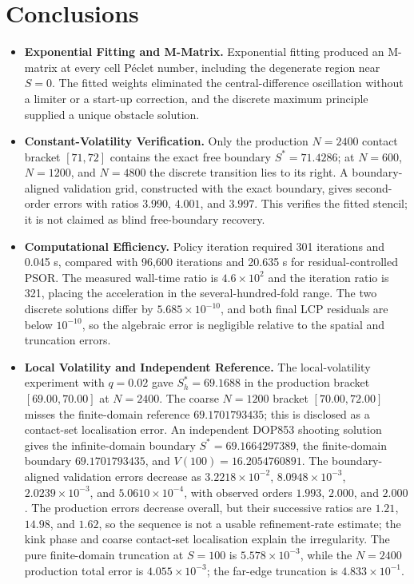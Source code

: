 \documentclass[11pt,a4paper]{article}
\theoremstyle{definition}
\theoremstyle{remark}
\begin{document}
\newpage
\section{Conclusions}
\label{sec:conclusions}


\begin{itemize}[leftmargin=2em]
\item \textbf{Exponential Fitting and M-Matrix.} Exponential fitting produced an M-matrix at every cell Péclet number, including the degenerate region near \(S=0\). The fitted weights eliminated the central-difference oscillation without a limiter or a start-up correction, and the discrete maximum principle supplied a unique obstacle solution.

\item \textbf{Constant-Volatility Verification.} Only the production \(N=2400\) contact bracket \([71,72]\) contains the exact free boundary \(S^* = 71.4286\); at \(N=600\), \(N=1200\), and \(N=4800\) the discrete transition lies to its right. A boundary-aligned validation grid, constructed with the exact boundary, gives second-order errors with ratios \(3.990\), \(4.001\), and \(3.997\). This verifies the fitted stencil; it is not claimed as blind free-boundary recovery.

\item \textbf{Computational Efficiency.} Policy iteration required 301 iterations and 0.045 s, compared with 96,600 iterations and 20.635 s for residual-controlled PSOR. The measured wall-time ratio is \(4.6 \times 10^2\) and the iteration ratio is 321, placing the acceleration in the several-hundred-fold range. The two discrete solutions differ by \(5.685 \times 10^{-10}\), and both final LCP residuals are below \(10^{-10}\), so the algebraic error is negligible relative to the spatial and truncation errors.

\item \textbf{Local Volatility and Independent Reference.} The local-volatility experiment with \(q = 0.02\) gave \(S_h^* = 69.1688\) in the production bracket \([69.00, 70.00]\) at \(N=2400\). The coarse \(N=1200\) bracket \([70.00,72.00]\) misses the finite-domain reference \(69.1701793435\); this is disclosed as a contact-set localisation error. An independent DOP853 shooting solution gives the infinite-domain boundary \(S^* = 69.1664297389\), the finite-domain boundary \(69.1701793435\), and \(V(100)=16.2054760891\). The boundary-aligned validation errors decrease as \(3.2218\times10^{-2}\), \(8.0948\times10^{-3}\), \(2.0239\times10^{-3}\), and \(5.0610\times10^{-4}\), with observed orders \(1.993\), \(2.000\), and \(2.000\). The production errors decrease overall, but their successive ratios are \(1.21\), \(14.98\), and \(1.62\), so the sequence is not a usable refinement-rate estimate; the kink phase and coarse contact-set localisation explain the irregularity. The pure finite-domain truncation at \(S=100\) is \(5.578\times10^{-3}\), while the \(N=2400\) production total error is \(4.055\times10^{-3}\); the far-edge truncation is \(4.833\times10^{-1}\).


\end{itemize}
\end{document}
